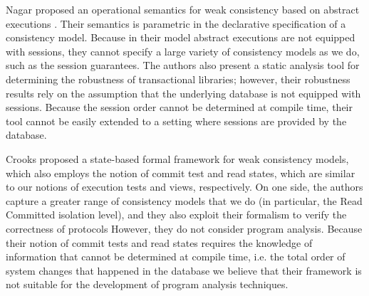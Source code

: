 Nagar \etal proposed an operational semantics for weak consistency 
based on abstract executions \cite{sureshConcur}. Their semantics 
is parametric in the declarative specification of a consistency model. Because 
in their model abstract executions are not equipped with sessions, they cannot 
specify a large variety of consistency models as we do, such as the session guarantees. 
The authors also present a static analysis tool for determining the robustness of transactional 
libraries; however, their robustness results rely on the assumption that the underlying database 
is not equipped with sessions. Because the session order cannot be determined at compile time, 
their tool cannot be easily extended to a setting where sessions are provided by the database. 


Crooks \etal proposed a state-based formal framework for weak consistency models, 
which also employs the notion of commit test and read states, which are similar 
to our notions of execution tests and views, respectively. On one side, the authors capture 
a greater range of consistency models that we do (in particular, the Read Committed isolation level), 
and they also exploit their formalism to verify the correctness of protocols
However, they do not consider program analysis. Because their notion of commit tests and read states requires 
the knowledge of information that cannot be determined at compile time, i.e. the total order of system changes that happened in the database 
we believe that their framework is not suitable for the development of program analysis techniques.

